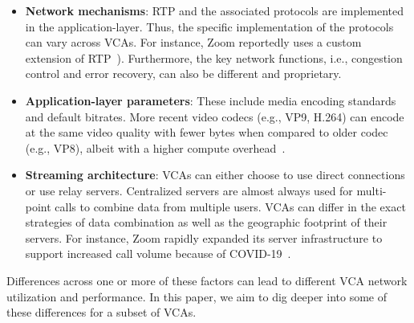 \begin{itemize}[noitemsep]
    \item \textbf{Network mechanisms}: RTP and the associated protocols are implemented in the application-layer. Thus, the specific implementation of the protocols can vary across VCAs. For instance, Zoom reportedly uses a custom extension of RTP~\cite{zoom_rtp}). Furthermore, the key network functions, i.e., congestion control and error recovery, can also be different and proprietary. %

    \item \textbf{Application-layer parameters}: These include media encoding standards and default bitrates. More recent video codecs (e.g., VP9, H.264) can encode at the same video quality with fewer bytes when compared to older codec (e.g., VP8), albeit with a higher compute overhead~\cite{bienik2016performance}. %
    
    \item \textbf{Streaming architecture}: VCAs can either choose to use direct connections or use relay servers. Centralized servers are almost always used for multi-point calls to combine data from multiple users. VCAs can differ in the exact strategies of data combination as well as the geographic footprint of their servers. For instance, Zoom rapidly expanded its server infrastructure to support increased call volume because of COVID-19~\cite{liu2020characterizing}. 

\end{itemize}


Differences across one or more of these factors can lead to different VCA network utilization and performance. In this paper, we aim to dig deeper into some of these differences for a subset of VCAs. 



